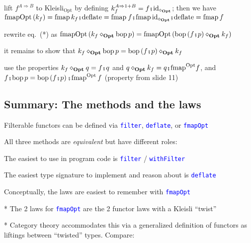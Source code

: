 lift $f^{A\Rightarrow B}$ to Kleisli$_{\text{Opt}}$ by defining
{\footnotesize{}$k_{f}^{A\Rightarrow1+B}=f\bef\text{id}_{\diamond_{\text{\textbf{Opt}}}}$;}
then we have $\text{fmapOpt}\left(k_{f}\right)=\text{fmap}\,k_{f}\bef\text{deflate}=\text{fmap}\:f\bef\text{fmap}\,\text{id}_{\diamond_{\text{\textbf{Opt}}}}\bef\text{deflate}=\text{fmap}\,f$

rewrite eq.\ ({*}) as {\footnotesize{}$\text{fmapOpt}\left(k_{f}\diamond_{\text{\textbf{Opt}}}\text{bop}\,p\right)=\text{fmapOpt}\left(\text{bop}\left(f\bef p\right)\diamond_{\text{\textbf{Opt}}}k_{f}\right)$ }{\footnotesize\par}

it remains to show that {\footnotesize{}$k_{f}\diamond_{\text{\textbf{Opt}}}\text{bop}\,p=\text{bop}\left(f\bef p\right)\diamond_{\text{\textbf{Opt}}}k_{f}$ }{\footnotesize\par}

use the properties {\footnotesize{}$k_{f}\diamond_{\text{\textbf{Opt}}}q=f\bef q$
and $q\diamond_{\text{\textbf{Opt}}}k_{f}=q\bef\text{fmap}^{\text{Opt}}f$,
and $f\bef\text{bop}\,p=\text{bop}\left(f\bef p\right)\bef\text{fmap}^{\text{Opt}}\,f$
(property from slide 11)}{\footnotesize\par}


\subsection{Summary: The methods and the laws}

Filterable functors can be defined via \texttt{\textcolor{blue}{\footnotesize{}filter}},
\texttt{\textcolor{blue}{\footnotesize{}deflate}}, or \texttt{\textcolor{blue}{\footnotesize{}fmapOpt}} 

All three methods are \emph{equivalent} but have different roles:

The easiest to use in program code is \texttt{\textcolor{blue}{\footnotesize{}filter}}
/ \texttt{\textcolor{blue}{\footnotesize{}withFilter}} 

The easiest type signature to implement and reason about is \texttt{\textcolor{blue}{\footnotesize{}deflate}} 

Conceptually, the laws are easiest to remember with \texttt{\textcolor{blue}{\footnotesize{}fmapOpt}} 

{*} The 2 laws for \texttt{\textcolor{blue}{\footnotesize{}fmapOpt}}
are the 2 functor laws with a Kleisli ``twist''

{*} Category theory accommodates this via a generalized definition
of functors as liftings between ``twisted'' types. Compare:

